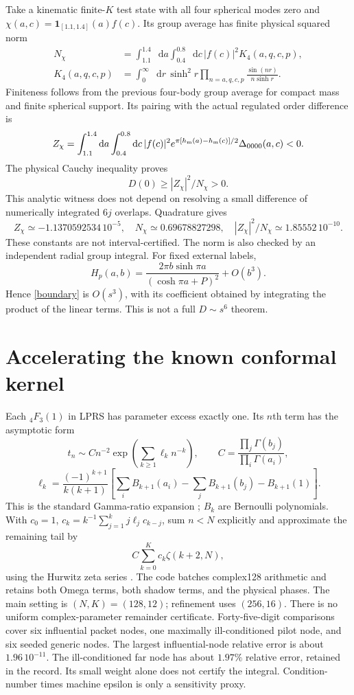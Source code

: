 \documentclass[11pt,a4paper]{article}
\newcommand{\dd}{\mathop{}\!\mathrm d}
\newcommand{\hh}{h_{\rm m}}
\begin{document}
Take a kinematic finite-$K$ test state with all four spherical modes
zero and $\chi(a,c)=\mathbf1_{[1.1,1.4]}(a)f(c)$.
Its group average has finite physical squared norm
\begin{align}
 N_\chi&=\int_{1.1}^{1.4}\dd a\int_{0.4}^{0.8}\dd c\,
                       |f(c)|^2K_4(a,q,c,p),\\
 K_4(a,q,c,p)&=\int_0^\infty\dd r\,\sinh^2r
       \prod_{n=a,q,c,p}\frac{\sin(nr)}{n\sinh r}.
\end{align}
Finiteness follows from the previous four-body group average for
compact mass and finite spherical support. Its pairing with the
actual regulated order difference is
\begin{equation}
 Z_\chi=\int_{1.1}^{1.4}\dd a\int_{0.4}^{0.8}\dd c\,
 |f(c)|^2e^{\pi[\hh(a)-\hh(c)]/2}\Delta_{0000}(a,c)<0.
\end{equation}
The physical Cauchy inequality proves
\begin{equation}
 D(0)\ge |Z_\chi|^2/N_\chi>0 . \label{lower}
\end{equation}
This analytic witness does not depend on resolving a small difference
of numerically integrated $6j$ overlaps.
Quadrature gives
\[
 Z_\chi\simeq-1.1370592534\,10^{-5},\quad
 N_\chi\simeq0.69678827298,\quad
 |Z_\chi|^2/N_\chi\simeq1.85552\,10^{-10}.
\]
These constants are not interval-certified. The norm is also checked
by an independent radial group integral.
For fixed external labels,
\[
 H_p(a,b)=\frac{2\pi b\sinh\pi a}{(\cosh\pi a+P)^2}+O(b^3).
\]
Hence \eqref{boundary} is $O(s^3)$, with its coefficient obtained by
integrating the product of the linear terms. This is not a full
$D\sim s^6$ theorem.

\section{Accelerating the known conformal kernel}
Each $ {}_4F_3(1)$ in LPRS has parameter excess exactly one.
Its $n$th term has the asymptotic form
\[
 t_n\sim C n^{-2}\exp\left(\sum_{k\ge1}\ell_kn^{-k}\right),
 \qquad C=\frac{\prod_j\Gamma(b_j)}{\prod_i\Gamma(a_i)},
\]
\[
 \ell_k=\frac{(-1)^{k+1}}{k(k+1)}
 \left[\sum_i B_{k+1}(a_i)-\sum_j B_{k+1}(b_j)-B_{k+1}(1)\right].
\]
This is the standard Gamma-ratio expansion \cite{dlmfgamma};
$B_k$ are Bernoulli polynomials.
With $c_0=1$, $c_k=k^{-1}\sum_{j=1}^k j\ell_jc_{k-j}$, sum $n<N$
explicitly and approximate the remaining tail by
\[
 C\sum_{k=0}^K c_k\zeta(k+2,N),
\]
using the Hurwitz zeta series \cite{dlmfzeta}.
The code batches complex128 arithmetic and retains both Omega terms,
both shadow terms, and the physical phases.
The main setting is $(N,K)=(128,12)$; refinement uses $(256,16)$.
There is no uniform complex-parameter remainder certificate.
Forty-five-digit comparisons cover six influential packet nodes,
one maximally ill-conditioned pilot node, and six seeded generic nodes.
The largest influential-node relative error is about $1.96\,10^{-11}$.
The ill-conditioned far node has about $1.97\%$ relative error,
retained in the record. Its small weight alone does not certify the
integral. Condition-number times machine epsilon is only a sensitivity proxy.
\end{document}
